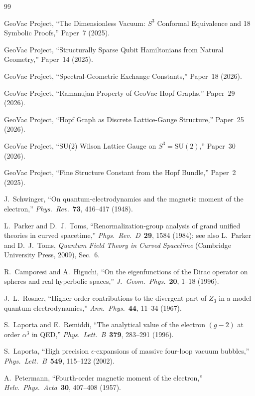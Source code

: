 \documentclass[11pt]{article}
\begin{document}
\begin{thebibliography}{99}

GeoVac Project, ``The Dimensionless Vacuum: $S^3$ Conformal Equivalence
and 18 Symbolic Proofs,'' Paper~7 (2025).

GeoVac Project, ``Structurally Sparse Qubit Hamiltonians from Natural
Geometry,'' Paper~14 (2025).

GeoVac Project, ``Spectral-Geometric Exchange Constants,'' Paper~18
(2026).

GeoVac Project, ``Ramanujan Property of GeoVac Hopf Graphs,'' Paper~29
(2026).

GeoVac Project, ``Hopf Graph as Discrete Lattice-Gauge Structure,''
Paper~25 (2026).

GeoVac Project, ``SU(2) Wilson Lattice Gauge on $S^3 = \mathrm{SU}(2)$,''
Paper~30 (2026).

GeoVac Project, ``Fine Structure Constant from the Hopf Bundle,''
Paper~2 (2025).

J.~Schwinger, ``On quantum-electrodynamics and the magnetic moment of
the electron,''
\textit{Phys.~Rev.}\ \textbf{73}, 416--417 (1948).

L.~Parker and D.~J.~Toms, ``Renormalization-group analysis of grand
unified theories in curved spacetime,''
\textit{Phys.~Rev.~D}\ \textbf{29}, 1584 (1984);
see also L.~Parker and D.~J.~Toms,
\textit{Quantum Field Theory in Curved Spacetime}
(Cambridge University Press, 2009), Sec.~6.

R.~Camporesi and A.~Higuchi, ``On the eigenfunctions of the Dirac
operator on spheres and real hyperbolic spaces,''
\textit{J.~Geom.~Phys.}\ \textbf{20}, 1--18 (1996).

J.~L.~Rosner, ``Higher-order contributions to the divergent part of
$Z_3$ in a model quantum electrodynamics,''
\textit{Ann.~Phys.}\ \textbf{44}, 11--34 (1967).

S.~Laporta and E.~Remiddi, ``The analytical value of the electron
$(g-2)$ at order $\alpha^3$ in QED,''
\textit{Phys.~Lett.~B}\ \textbf{379}, 283--291 (1996).

S.~Laporta, ``High precision $\epsilon$-expansions of massive four-loop
vacuum bubbles,''
\textit{Phys.~Lett.~B}\ \textbf{549}, 115--122 (2002).

A.~Petermann, ``Fourth-order magnetic moment of the electron,''
\textit{Helv.~Phys.~Acta}\ \textbf{30}, 407--408 (1957).


\end{thebibliography}
\end{document}
